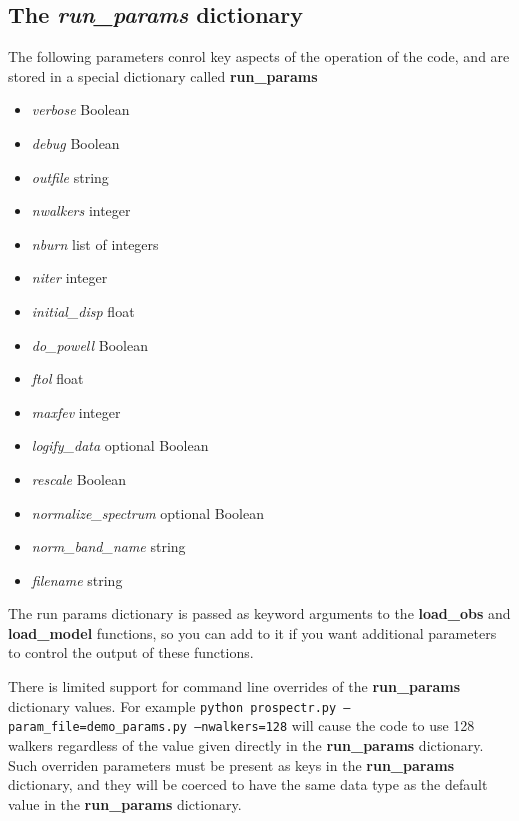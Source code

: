 \documentclass[12pt, letterpaper, preprint]{aastex}
\begin{document}
\subsection{The \emph{run\_params} dictionary}
The following parameters conrol key aspects of the operation of the
code, and are stored in a special dictionary called {\bf run\_params}

\begin{itemize}
\item {\it verbose} Boolean
\item {\it debug} Boolean
\item {\it outfile} string

\item {\it nwalkers} integer
\item {\it nburn} list of integers
\item {\it niter} integer

\item {\it initial\_disp} float
\item {\it do\_powell} Boolean
\item {\it ftol} float
\item {\it maxfev} integer


\item {\it logify\_data} optional Boolean
\item {\it rescale} Boolean
\item {\it normalize\_spectrum} optional Boolean
\item {\it norm\_band\_name} string

\item {\it filename} string
\end{itemize}

The run params dictionary is passed as keyword arguments to the
{\bf load\_obs} and {\bf load\_model} functions, so you can add to it if you want
additional parameters to control the output of these functions.

There is limited support for command line overrides of the {\bf
run\_params} dictionary values. For example
\texttt{python prospectr.py --param\_file=demo\_params.py
  --nwalkers=128}
will cause the code to use 128 walkers regardless of the value given
directly in the {\bf run\_params} dictionary.  Such overriden
parameters must be present as keys in the {\bf run\_params} dictionary,
and they will be coerced to have the same data type as the default
value in the {\bf run\_params} dictionary.
\end{document}
